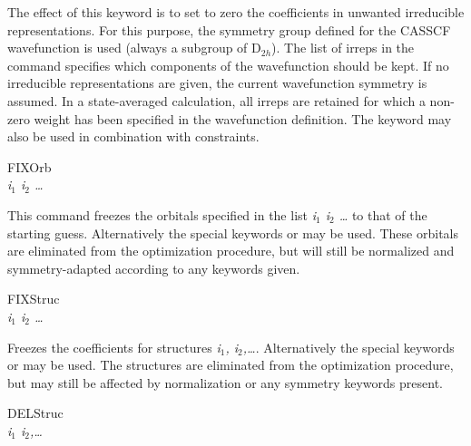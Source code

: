 \begin{keywordlist}
The effect of this keyword is to set to zero the coefficients in unwanted
irreducible representations.
For this purpose, the symmetry group defined for the CASSCF wavefunction
is used (always a subgroup of D$_{2h}$).
The list of irreps in the command specifies which components
of the wavefunction should be kept.
If no irreducible representations are given, the current
wavefunction symmetry is assumed. In a state-averaged calculation,
all irreps are retained for which a non-zero weight has been specified in the
wavefunction definition.
The  keyword may also be used in combination with constraints.
\item[FIXOrb]
\\
{\em i$_1$ i$_2$ \ldots}

This command freezes the orbitals specified in the list
{\em i$_1$ i$_2$ \ldots} to that of the starting guess. Alternatively the
special keywords  or  may be used. These orbitals
are eliminated from the optimization procedure, but will still be
normalized and symmetry-adapted according to any 
keywords given.
\item[FIXStruc]
\\
{\em i$_1$ i$_2$ \ldots}

Freezes the coefficients for structures {\em i$_1$, i$_2$,\ldots}. Alternatively
the special keywords  or  may be used. The
structures are eliminated from the optimization procedure, but may
still be affected by normalization or any symmetry keywords present.
\item[DELStruc]
\\
{\em i$_1$ i$_2$,\ldots}


\end{keywordlist}
